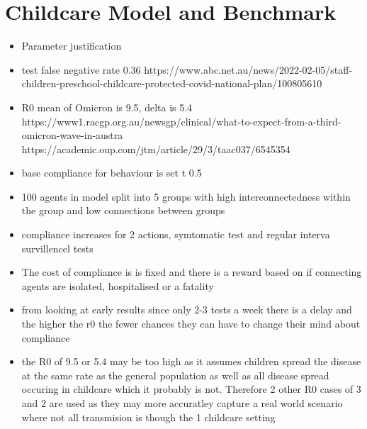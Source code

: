 \documentclass{article}
\begin{document}
\section{Childcare Model and Benchmark}

\begin{itemize}

\item Parameter justification
\item test false negative rate 0.36 https://www.abc.net.au/news/2022-02-05/staff-children-preschool-childcare-protected-covid-national-plan/100805610
\item R0 mean of Omicron is 9.5, delta is 5.4  https://www1.racgp.org.au/newsgp/clinical/what-to-expect-from-a-third-omicron-wave-in-austra https://academic.oup.com/jtm/article/29/3/taac037/6545354
\item base compliance for behaviour is set t 0.5
\item 100 agents in model split into 5 groups with high interconnectedness within the group and low connections between groups

\item compliance increases for 2 actions,  symtomatic test and regular interva survillencel tests
\item The cost of compliance is is fixed and there is a reward based on if connecting agents are isolated, hospitalised or a fatality

\item from looking at early results since only 2-3 tests a week there is a delay and the higher the r0 the fewer chances they can have to change their mind about compliance 

\item the R0 of 9.5 or 5.4 may be too high as it assumes children spread the disease at the same rate as the general population as well as all disease spread occuring in childcare which it probably is not. Therefore 2 other R0 cases of 3 and 2 are used as they may more accuratley capture a real world scenario where not all transmision is though the 1 childcare setting
\end{itemize}
\end{document}
